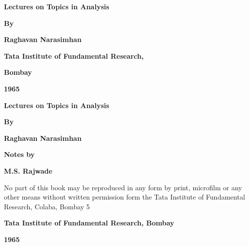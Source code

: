 \thispagestyle{empty}

\begin{center}
{\Large\bf Lectures on Topics in Analysis}
\vskip 1cm


{\bf  By}
\medskip

{\large\bf  Raghavan Narasimhan}
\vfill

{\bf  Tata Institute of Fundamental Research,}

{\bf Bombay}

{\bf  1965}
\end{center}

\eject

\thispagestyle{empty}
\newpage

\begin{center}
{\Large\bf Lectures on Topics in Analysis}
\vskip 1cm


{\bf  By}
\medskip

{\large\bf  Raghavan Narasimhan}
\vfill

{\bf  Notes by}
\medskip

{\large\bf  M.S. Rajwade}
\vfill


\parbox{0.7\textwidth}{%
No part of this book may be reproduced in any form by print,
microfilm or any other means without written permission form the
Tata Institute of Fundamental Research, Colaba, Bombay 5}
\vfill

{\bf  Tata Institute of Fundamental Research, Bombay}

{\bf 1965}
\end{center}

